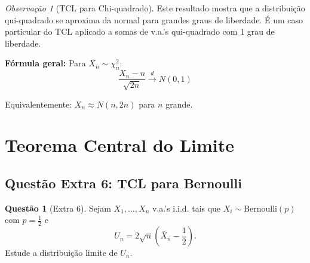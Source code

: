 \documentclass[12pt,a4paper]{article}
\theoremstyle{definition}
\newtheorem{questao}{Questão}[section]
\theoremstyle{remark}
\newtheorem{observacao}{Observação}[section]
\begin{document}
\begin{observacao}[TCL para Chi-quadrado]
Este resultado mostra que a distribuição qui-quadrado se aproxima da normal para grandes graus de liberdade. É um caso particular do TCL aplicado a somas de v.a.'s qui-quadrado com 1 grau de liberdade.

\textbf{Fórmula geral:} Para $X_n \sim \chi^2_n$:
\[
\frac{X_n - n}{\sqrt{2n}} \xrightarrow{d} N(0,1)
\]

Equivalentemente: $X_n \approx N(n, 2n)$ para $n$ grande.
\end{observacao}

\section{Teorema Central do Limite}

\subsection{Questão Extra 6: TCL para Bernoulli}

\begin{questao}[Extra 6]
Sejam $X_1, \ldots, X_n$ v.a.'s i.i.d. tais que $X_i \sim \text{Bernoulli}(p)$ com $p = \frac{1}{2}$ e 
\[
U_n = 2 \sqrt{n} \left( \bar{X}_n - \frac{1}{2} \right).
\]
Estude a distribuição limite de $U_n$.
\end{questao}
\end{document}
